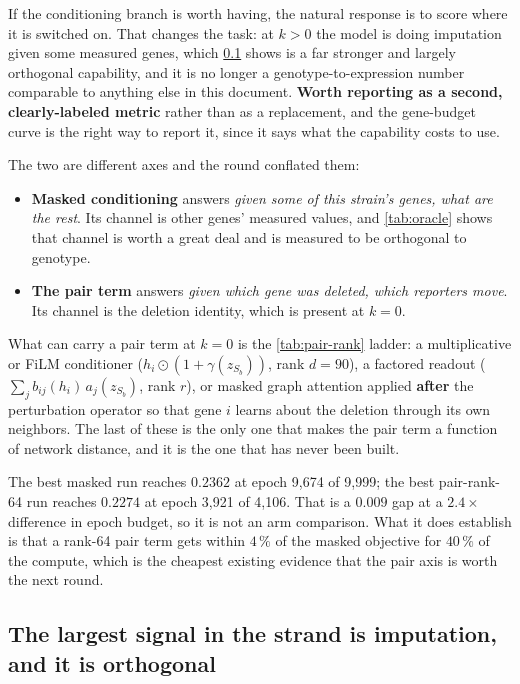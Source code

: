  If the
conditioning branch is worth having, the natural response is to score where it is switched
on. That changes the task: at $k > 0$ the model is doing imputation given some measured
genes, which \cref{sec:oracle} shows is a far stronger and largely orthogonal capability, and
it is no longer a genotype-to-expression number comparable to anything else in this
document. \textbf{Worth reporting as a second, clearly-labeled metric} rather than as a
replacement, and the gene-budget curve is the right way to report it, since it says what the
capability costs to use.

The two are different axes and the round conflated them:

\begin{itemize}
\item \textbf{Masked conditioning} answers \emph{given some of this strain's genes, what
  are the rest}. Its channel is other genes' measured values, and
  \cref{tab:oracle} shows that channel is worth a great deal and is measured to be
  orthogonal to genotype.
\item \textbf{The pair term} answers \emph{given which gene was deleted, which reporters
  move}. Its channel is the deletion identity, which is present at $k = 0$.
\end{itemize}

What can carry a pair term at $k = 0$ is the \cref{tab:pair-rank} ladder: a multiplicative
or FiLM conditioner ($h_i \odot (1 + \gamma(z_{S_b}))$, rank $d = 90$), a factored readout
($\sum_j b_{ij}(h_i)\,a_j(z_{S_b})$, rank $r$), or masked graph attention applied
\textbf{after} the perturbation operator so that gene $i$ learns about the deletion through
its own neighbors. The last of these is the only one that makes the pair term a function of
network distance, and it is the one that has never been built.

 The best masked run reaches $0.2362$
at epoch 9,674 of 9,999; the best pair-rank-64 run reaches $0.2274$ at epoch 3,921 of
4,106. That is a $0.009$ gap at a $2.4\times$ difference in epoch budget, so it is not an
arm comparison. What it does establish is that a rank-64 pair term gets within $4\,\%$ of
the masked objective for $40\,\%$ of the compute, which is the cheapest existing evidence
that the pair axis is worth the next round.

\subsection{The largest signal in the strand is imputation, and it is orthogonal}
\label{sec:oracle}

